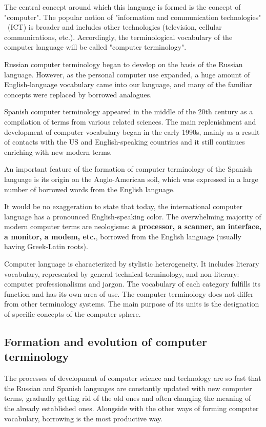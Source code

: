 \documentclass[12pt, a4paper, twoside]{report}
\begin{document}
The central concept around which this language is formed is the concept of "computer". The popular notion of "information and communication technologies" \ (ICT) is broader and includes other technologies (television, cellular communica\-tions, etc.). Accordingly, the terminological vocabulary of the computer language will be called "computer terminology".

Russian computer terminology began to develop on the basis of the Russian language. However, as the personal computer use expanded, a huge amount of English-language vocabulary came into our language, and many of the familiar concepts were replaced by borrowed analogues. 

Spanish computer terminology appeared in the middle of the 20th century as a compilation of terms from various related sciences. The main replenishment and development of computer vocabulary began in the early 1990s, mainly as a result of contacts with the US and English-speaking countries and it still continues enriching with new modern terms.

An important feature of the formation of computer terminology of the Spanish language is its origin on the Anglo-American soil, which was expressed in a large number of borrowed words from the English language.

It would be no exaggeration to state that today, the international computer language has a pronounced English-speaking color. The overwhelming majority of modern computer terms are neologisms: \textbf{a processor, a scanner, an interface, a monitor, a modem, etc.}, borrowed from the English language (usually having Greek-Latin roots).

Computer language is characterized by stylistic heterogeneity. It includes litera\-ry vocabulary, represented by general technical terminology, and non-literary: compu\-ter professionalisms and jargon. The vocabulary of each category fulfills its function and has its own area of use. The computer terminology does not differ from other terminology systems. The main purpose of its units is the designation of specific concepts of the computer sphere.

\subsection{Formation and evolution of computer terminology}

The processes of development of computer science and technology are so fast that the Russian and Spanish languages are constantly updated with new computer terms, gradually getting rid of the old ones and often changing the meaning of the already established ones. Alongside with the other ways of forming computer vocabulary, borrowing is the most productive way.
\end{document}
